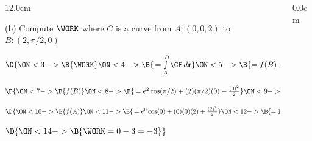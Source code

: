 %
\begin{frame}
\begin{columns}\begin{column}{12.0cm}

\vspace{0.1cm}

\scriptsize

(b) Compute $\WORK$ \quad where $C$ is a curve from $A:(0,0,2)$ to $B:\left(2,\pi/2,0\right)$

\vspace{0.2cm}


\begin{center}
	$\D{
	\ON<3->{\B{\WORK }}
	\ON<4->{\B{\, = \int \limits_{A}^{B} \GF \, d{\bf r}}}
	\ON<5->{\B{ = f(B) - f(A)}}
	}$
\end{center}


\vspace{0.3cm}

\quad $\D{
\ON<7->{\B{f(B) }}
\ON<8->{\B{\, = e^{2}\cos(\pi/2) + (2)(\pi/2)(0) + \frac{(0)^2}{2}}}
\ON<9->{\B{ = 0}}}$

\quad $\D{
\ON<10->{\B{f(A) }}
\ON<11->{\B{\, = e^{0}\cos(0) + (0)(0)(2) + \frac{(2)^2}{2}}}
\ON<12->{\B{= 1+2=3}}}$

\vspace{0.3cm}


\vspace{0.3cm}

\quad $\D{
\ON<14->{\B{\WORK = 0 - 3 = -3}}}$

\vspace{7.5cm}
	
\end{column}\begin{column}{0.0cm}\end{column}\end{columns}
\end{frame}
%
